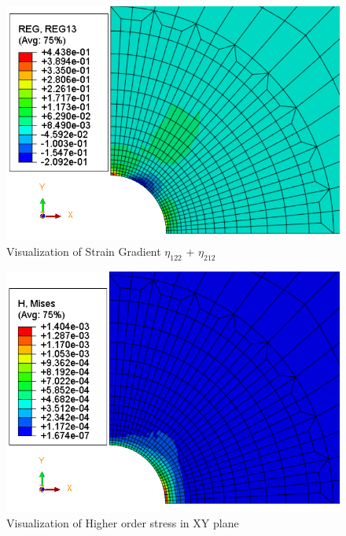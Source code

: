 \documentclass[12pt]{article}
\begin{document}
\begin{figure}[H]
	\begin{center}
		\includegraphics[scale=0.9]{Reg13_crop.png} 
	\end{center}  
   \caption{Visualization of Strain Gradient $\eta_{122}$ + $\eta_{212}$}
\end{figure}
\begin{figure}[H]
	\begin{center}
		\includegraphics[scale=0.9]{Higher_order_stress_crop.png} 
	\end{center}  
	\caption{Visualization of Higher order stress in XY plane}
\end{figure}
\end{document}
